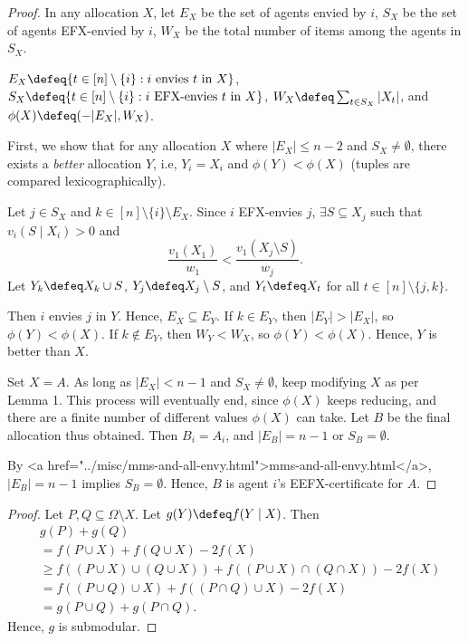 \begin{proof}
In any allocation $X$, let
$E_X$ be the set of agents envied by $i$,
$S_X$ be the set of agents EFX-envied by $i$,
$W_X$ be the total number of items among the agents in $S_X$.

$E_X \defeq \{t \in [n] \setminus \{i\}: i \textrm{ envies } t \textrm{ in } X\}$,
$S_X \defeq \{t \in [n] \setminus \{i\}: i \textrm{ EFX-envies } t \textrm{ in } X\}$,
$W_X \defeq \sum_{t \in S_X} |X_t|$, and $\phi(X) \defeq (-|E_X|, W_X)$.

First, we show that for any allocation $X$ where $|E_X| \le n-2$ and $S_X \neq \emptyset$,
there exists a \emph{better} allocation $Y$, i.e, $Y_i = X_i$ and $\phi(Y) < \phi(X)$
(tuples are compared lexicographically).

Let $j \in S_X$ and $k \in [n] \setminus \{i\} \setminus E_X$.
Since $i$ EFX-envies $j$, $\exists S \subseteq X_j$ such that $v_i(S \mid X_i) > 0$ and
\[ \frac{v_1(X_1)}{w_1} < \frac{v_1(X_j \setminus S)}{w_j}. \]
Let $Y_k \defeq X_k \cup S$, $Y_j \defeq X_j \setminus S$,
and $Y_t \defeq X_t$ for all $t \in [n] \setminus \{j, k\}$.

Then $i$ envies $j$ in $Y$. Hence, $E_X \subseteq E_Y$.
If $k \in E_Y$, then $|E_Y| > |E_X|$, so $\phi(Y) < \phi(X)$.
If $k \not\in E_Y$, then $W_Y < W_X$, so $\phi(Y) < \phi(X)$.
Hence, $Y$ is better than $X$.

Set $X = A$. As long as $|E_X| < n-1$ and $S_X \neq \emptyset$,
keep modifying $X$ as per Lemma 1.
This process will eventually end, since $\phi(X)$ keeps reducing,
and there are a finite number of different values $\phi(X)$ can take.
Let $B$ be the final allocation thus obtained.
Then $B_i = A_i$, and $|E_B| = n-1$ or $S_B = \emptyset$.

By <a href="../misc/mms-and-all-envy.html">mms-and-all-envy.html</a>,
$|E_B| = n-1$ implies $S_B = \emptyset$.
Hence, $B$ is agent $i$'s EEFX-certificate for $A$.
\end{proof}

\begin{proof}
Let $P, Q \subseteq \Omega \setminus X$. Let $g(Y) \defeq f(Y \mid X)$. Then
\begin{align*}
& g(P) + g(Q)
\\ &= f(P \cup X) + f(Q \cup X) - 2f(X)
\\ &\ge f((P \cup X) \cup (Q \cup X)) + f((P \cup X) \cap (Q \cap X)) - 2f(X)
    \tag{by $f$'s submodularity}
\\ &= f((P \cup Q) \cup X) + f((P \cap Q) \cup X) - 2f(X)
    \tag{by De Morgan's law}
\\ &= g(P \cup Q) + g(P \cap Q).
\end{align*}
Hence, $g$ is submodular.
\end{proof}

